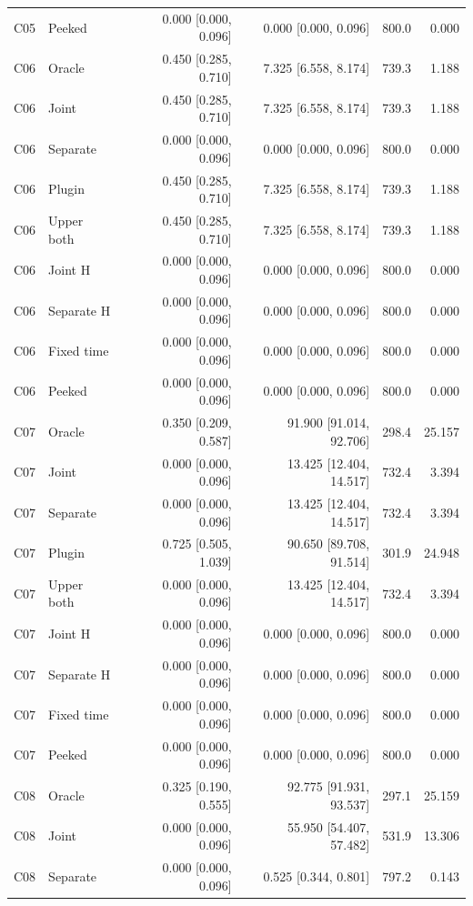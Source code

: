 \begin{longtable}{llrrrr}
C05 & Peeked & 0.000 [0.000, 0.096] & 0.000 [0.000, 0.096] & 800.0 & 0.000\\
C06 & Oracle & 0.450 [0.285, 0.710] & 7.325 [6.558, 8.174] & 739.3 & 1.188\\
C06 & Joint & 0.450 [0.285, 0.710] & 7.325 [6.558, 8.174] & 739.3 & 1.188\\
C06 & Separate & 0.000 [0.000, 0.096] & 0.000 [0.000, 0.096] & 800.0 & 0.000\\
C06 & Plugin & 0.450 [0.285, 0.710] & 7.325 [6.558, 8.174] & 739.3 & 1.188\\
C06 & Upper both & 0.450 [0.285, 0.710] & 7.325 [6.558, 8.174] & 739.3 & 1.188\\
C06 & Joint H & 0.000 [0.000, 0.096] & 0.000 [0.000, 0.096] & 800.0 & 0.000\\
C06 & Separate H & 0.000 [0.000, 0.096] & 0.000 [0.000, 0.096] & 800.0 & 0.000\\
C06 & Fixed time & 0.000 [0.000, 0.096] & 0.000 [0.000, 0.096] & 800.0 & 0.000\\
C06 & Peeked & 0.000 [0.000, 0.096] & 0.000 [0.000, 0.096] & 800.0 & 0.000\\
C07 & Oracle & 0.350 [0.209, 0.587] & 91.900 [91.014, 92.706] & 298.4 & 25.157\\
C07 & Joint & 0.000 [0.000, 0.096] & 13.425 [12.404, 14.517] & 732.4 & 3.394\\
C07 & Separate & 0.000 [0.000, 0.096] & 13.425 [12.404, 14.517] & 732.4 & 3.394\\
C07 & Plugin & 0.725 [0.505, 1.039] & 90.650 [89.708, 91.514] & 301.9 & 24.948\\
C07 & Upper both & 0.000 [0.000, 0.096] & 13.425 [12.404, 14.517] & 732.4 & 3.394\\
C07 & Joint H & 0.000 [0.000, 0.096] & 0.000 [0.000, 0.096] & 800.0 & 0.000\\
C07 & Separate H & 0.000 [0.000, 0.096] & 0.000 [0.000, 0.096] & 800.0 & 0.000\\
C07 & Fixed time & 0.000 [0.000, 0.096] & 0.000 [0.000, 0.096] & 800.0 & 0.000\\
C07 & Peeked & 0.000 [0.000, 0.096] & 0.000 [0.000, 0.096] & 800.0 & 0.000\\
C08 & Oracle & 0.325 [0.190, 0.555] & 92.775 [91.931, 93.537] & 297.1 & 25.159\\
C08 & Joint & 0.000 [0.000, 0.096] & 55.950 [54.407, 57.482] & 531.9 & 13.306\\
C08 & Separate & 0.000 [0.000, 0.096] & 0.525 [0.344, 0.801] & 797.2 & 0.143\\

\end{longtable}
